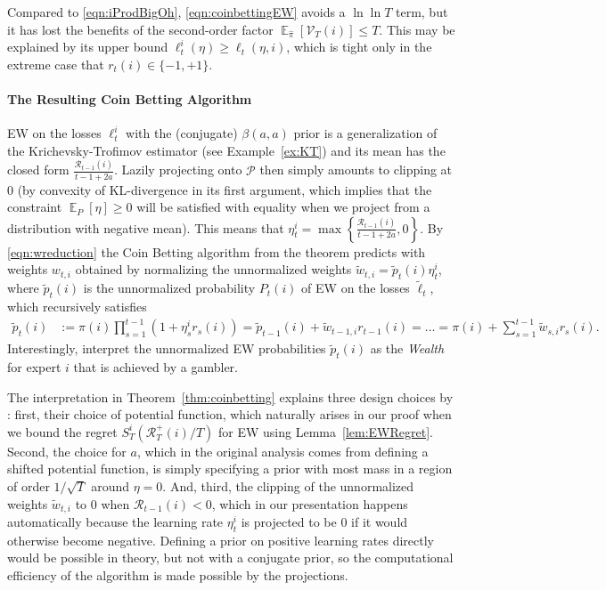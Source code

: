 \documentclass{colt2018} %
\DeclareMathOperator*{\E}{\mathbb{E}}
\newcommand{\domainP}{\mathcal{P}}
\newcommand{\sloss}{\ell}                       %
\newcommand{\altsloss}{\tilde{\ell}}            %
\newcommand{\sregret}{S}                        %
\newcommand{\altw}{\tilde{w}}                   %
\newcommand{\altp}{\tilde{p}}                   %
\newcommand{\postpi}{\hat{\pi}}                 %
\newcommand{\regret}{\mathcal{R}}
\newcommand{\V}{\mathcal{V}}                    %
\begin{document}
% 
Compared to \eqref{eqn:iProdBigOh}, \eqref{eqn:coinbettingEW} avoids a
$\ln \ln T$ term, but it has lost the benefits of the second-order
factor $\E_{\postpi}[\V_T(i)] \leq T$. This may be explained by its upper
bound $\sloss_t^i(\eta) \geq \sloss_t(\eta,i)$, which is tight only in
the extreme case that
$r_t(i) \in \{-1,+1\}$.

\paragraph{The Resulting Coin Betting Algorithm}

EW on the losses $\sloss_t^i$ with the (conjugate) $\beta(a,a)$ prior is
a generalization of the Krichevsky-Trofimov estimator (see
Example~\ref{ex:KT}) and its mean has the closed form
$\frac{\regret_{t-1}(i)}{t-1+2a}$. Lazily projecting onto $\domainP$ then
simply amounts to clipping at $0$ (by convexity of KL-divergence in its
first argument, which implies that the constraint $\E_P[\eta] \geq 0$
will be satisfied with equality when we project from a distribution with
negative mean). This means that
% 
% 
  $\eta_t^i = \max\left\{\frac{\regret_{t-1}(i)}{t-1+2a},0\right\}$.
% 
% 
By \eqref{eqn:wreduction} the Coin Betting algorithm from the theorem
predicts with weights $w_{t,i}$ obtained by normalizing the unnormalized
weights
% 
% 
  $\altw_{t,i} = \altp_t(i)\eta_t^i$,
% 
% 
where $\altp_t(i)$ is the unnormalized probability $P_t(i)$ of EW on the
losses $\altsloss_t$, which recursively satisfies
% 
\begin{align*}
  \altp_t(i) &:= \pi(i)\prod_{s=1}^{t-1}(1+\eta_s^i r_s(i))
             = \altp_{t-1}(i) + \altw_{t-1,i} r_{t-1}(i)
             = \ldots = \pi(i) + \sum_{s=1}^{t-1} \altw_{s,i} r_s(i).
\end{align*}
% 
Interestingly, \citet{OrabonaPal2016} interpret the unnormalized EW
probabilities $\altp_t(i)$ as the \emph{Wealth} for expert $i$ that is
achieved by a gambler.

The interpretation in Theorem~\ref{thm:coinbetting} explains three
design choices by \citet{OrabonaPal2016}: first, their choice of
potential function, which naturally arises in our proof when we bound
the regret $\sregret_T^i(\regret_T^+(i)/T)$ for EW using
Lemma~\ref{lem:EWRegret}. Second, the choice for $a$, which in the
original analysis comes from defining a shifted potential function, is
simply specifying a prior with most mass in a region of order
$1/\sqrt{T}$ around $\eta = 0$. And, third, the clipping of the
unnormalized weights $\altw_{t,i}$ to $0$ when $\regret_{t-1}(i) < 0$, which
in our presentation happens automatically because the learning rate
$\eta_t^i$ is projected to be $0$ if it would otherwise become negative.
Defining a prior on positive learning rates directly would be possible
in theory, but not with a conjugate prior, so the computational
efficiency of the algorithm is made possible by the projections.
\end{document}
